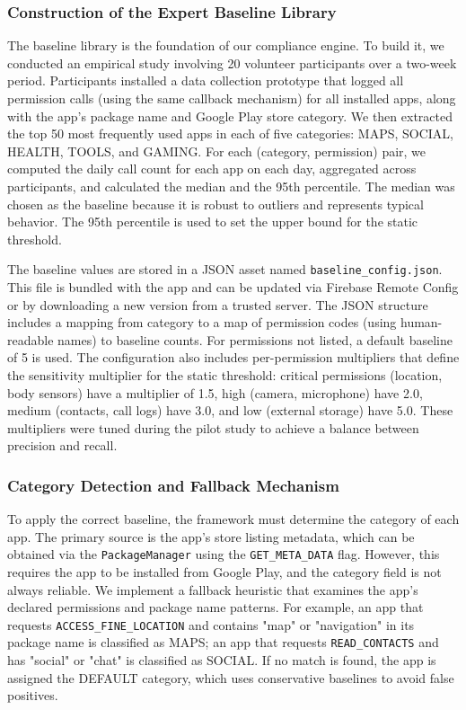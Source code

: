 \subsubsection{Construction of the Expert Baseline Library}

The baseline library is the foundation of our compliance engine. To build it, we conducted an empirical study involving 20 volunteer participants over a two-week period. Participants installed a data collection prototype that logged all permission calls (using the same callback mechanism) for all installed apps, along with the app's package name and Google Play store category. We then extracted the top 50 most frequently used apps in each of five categories: MAPS, SOCIAL, HEALTH, TOOLS, and GAMING. For each (category, permission) pair, we computed the daily call count for each app on each day, aggregated across participants, and calculated the median and the 95th percentile. The median was chosen as the baseline because it is robust to outliers and represents typical behavior. The 95th percentile is used to set the upper bound for the static threshold.

The baseline values are stored in a JSON asset named \texttt{baseline\_config.json}. This file is bundled with the app and can be updated via Firebase Remote Config or by downloading a new version from a trusted server. The JSON structure includes a mapping from category to a map of permission codes (using human-readable names) to baseline counts. For permissions not listed, a default baseline of 5 is used. The configuration also includes per-permission multipliers that define the sensitivity multiplier for the static threshold: critical permissions (location, body sensors) have a multiplier of 1.5, high (camera, microphone) have 2.0, medium (contacts, call logs) have 3.0, and low (external storage) have 5.0. These multipliers were tuned during the pilot study to achieve a balance between precision and recall.

\subsubsection{Category Detection and Fallback Mechanism}

To apply the correct baseline, the framework must determine the category of each app. The primary source is the app's store listing metadata, which can be obtained via the \texttt{PackageManager} using the \texttt{GET\_META\_DATA} flag. However, this requires the app to be installed from Google Play, and the category field is not always reliable. We implement a fallback heuristic that examines the app's declared permissions and package name patterns. For example, an app that requests \texttt{ACCESS\_FINE\_LOCATION} and contains "map" or "navigation" in its package name is classified as MAPS; an app that requests \texttt{READ\_CONTACTS} and has "social" or "chat" is classified as SOCIAL. If no match is found, the app is assigned the DEFAULT category, which uses conservative baselines to avoid false positives.

